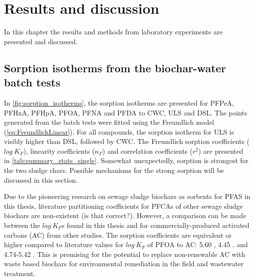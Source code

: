 \chapter{Results and discussion}\label{chap:Results&Disc}
In this chapter the results and methods from laboratory experiments are presented and discussed.

\section{Sorption isotherms from the biochar-water batch tests}
In \cref{fig:sorption_isotherms}, the sorption isotherms are presented for PFPeA, PFHxA, PFHpA, PFOA, PFNA and PFDA to CWC, ULS and DSL. The points generated from the batch tests were fitted using the Freundlich model (\cref{eq:FreundlichLinear}). For all compounds, the sorption isotherm for ULS is visibly higher than DSL, followed by CWC. The Freundlich sorption coefficients ($log~K_F$), linearity coefficients ($n_F$) and correlation coefficients ($r^2$) are presented in \cref{tab:summary_stats_single}. Somewhat unexpectedly, sorption is strongest for the two sludge chars. Possible mechanisms for the strong sorption will be discussed in this section. 

Due to the pioneering research on sewage sludge biochars as sorbents for PFAS in this thesis, literature partitioning coefficients for PFCAs of other sewage sludge biochars are non-existent (is that correct?). However, a comparison can be made between the $log~K_F$s found in this thesis and for commercially-produced activated carbons (AC) from other studies. The sorption coefficients are equivalent or higher compared to literature values for $log~K_F$ of PFOA to AC: 5.60 \citep{Kupryianchyk2016a}, 4.45 \citep{hansen2010sorption}, and 4.74-5.42 \citep{silvani2019can}. This is promising for the potential to replace non-renewable AC with waste based biochars for environmental remediation in the field and wastewater treatment. 

